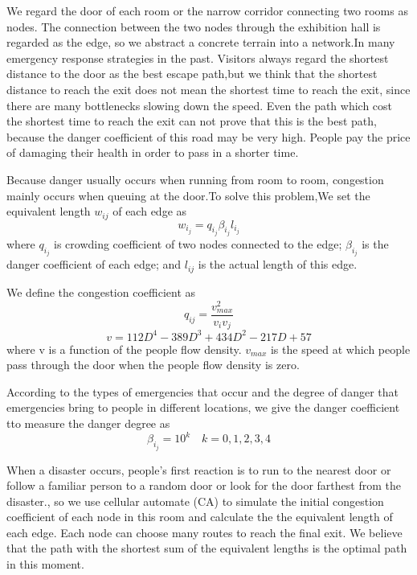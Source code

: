 We regard the door of each room or the narrow corridor connecting two rooms as nodes. The connection between the two nodes through the exhibition hall is regarded as the edge, so we abstract a concrete terrain into a network.In many emergency response strategies in the past. Visitors always regard the shortest distance to the door as the best escape path,but we think that the shortest distance to reach the exit does not mean the shortest time to reach the exit, since there are many bottlenecks slowing down the speed. Even the path which cost the shortest time to reach the exit can not prove that this is the best path, because the danger coefficient of this road may be very high. People pay the price of damaging their health in order to pass in a shorter time.

Because danger usually occurs when running from room to room, congestion mainly occurs when queuing at the door.To solve this problem,We set the equivalent length $w_{ij}$ of each edge as
\begin{equation}
  w_i_j=q_i_j\beta_i_j l_i_j
\end{equation}
where $q_i_j$ is crowding coefficient of two nodes connected to the edge; $\beta_i_j$ is the danger coefficient of each edge; and $l_{ij}$ is the actual length of this edge.

We define the congestion coefficient as 
\[q_{ij}= \frac{v_{max}^2}{v_iv_j}\]
\[
v=112D^4-389D^3+434D^2-217D+57
\]
where v is a function of the people flow density.
$v_{max}$ is the speed at which people pass through the door when the people flow density is zero.

According to the types of emergencies that occur and the degree of danger that emergencies bring to people in different locations, we give the danger coefficient tto measure the danger degree as
\[\beta_i_j=10^k   \quad k=0,1,2,3,4\]

When a disaster occurs, people's first reaction is to run to the nearest door or follow a familiar person to a random door or look for the door farthest from the disaster., so we use cellular automate (CA) to simulate the initial congestion coefficient of each node in this room
and calculate the the equivalent length of each edge. Each node can choose many routes to reach the final exit. We believe that the path with the shortest sum of the equivalent lengths is the optimal path in this moment.

